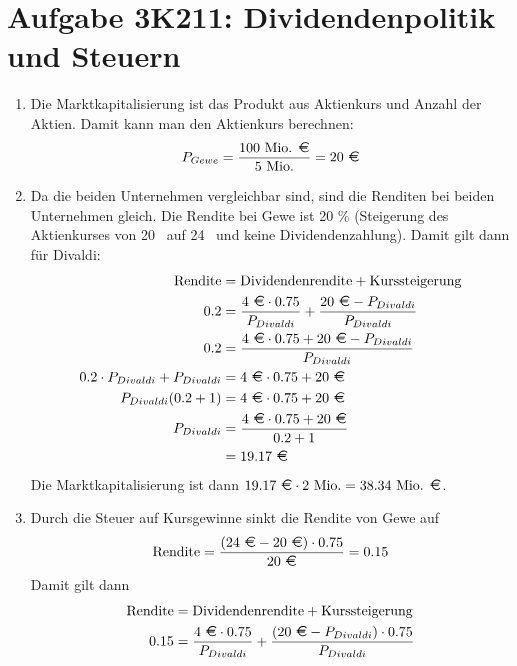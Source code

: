 \documentclass{article}
\begin{document}
	\section*{Aufgabe 3K211: Dividendenpolitik und Steuern}
	\begin{enumerate}[label=(\alph*)]
		\item Die Marktkapitalisierung ist das Produkt aus Aktienkurs und Anzahl der Aktien. Damit kann man den Aktienkurs berechnen:
		\begin{align}
			P_{Gewe} = \frac{100 \text{ Mio. \EUR}}{5 \text{ Mio.}} = 20 \text{ \EUR} \notag
		\end{align}
		\item Da die beiden Unternehmen vergleichbar sind, sind die Renditen bei beiden Unternehmen gleich. Die Rendite bei Gewe ist 20 \% (Steigerung des Aktienkurses von 20 \EUR\, auf 24 \EUR\, und keine Dividendenzahlung). Damit gilt dann für Divaldi:
		\begin{align}
			\text{Rendite} &= \text{Dividendenrendite} + \text{Kurssteigerung} \notag \\
			0.2 &= \frac{4\text{ \EUR}\cdot 0.75}{P_{Divaldi}} + \frac{20\text{ \EUR} - P_{Divaldi}}{P_{Divaldi}} \notag \\
			0.2 &= \frac{4\text{ \EUR}\cdot 0.75 + 20\text{ \EUR} - P_{Divaldi}}{P_{Divaldi}} \notag \\
			0.2\cdot P_{Divaldi} + P_{Divaldi} &= 4\text{ \EUR}\cdot 0.75 + 20 \text{ \EUR} \notag \\
			P_{Divaldi}(0.2 + 1) &= 4\text{ \EUR}\cdot 0.75 + 20 \text{ \EUR} \notag \\
			P_{Divaldi} &= \frac{4\text{ \EUR}\cdot 0.75 + 20 \text{ \EUR}}{0.2 + 1} \notag \\
			&= 19.17 \text{ \EUR} \notag
		\end{align}
		Die Marktkapitalisierung ist dann $19.17\text{ \EUR}\cdot 2\text{ Mio.} = 38.34\text{ Mio. \EUR}$.
		\item Durch die Steuer auf Kursgewinne sinkt die Rendite von Gewe auf
		\begin{align}
			\text{Rendite} = \frac{(24\text{ \EUR} - 20\text{ \EUR})\cdot 0.75}{20\text{ \EUR}}  = 0.15 \notag
		\end{align}
		Damit gilt dann
		\begin{align}
			\text{Rendite} &= \text{Dividendenrendite} + \text{Kurssteigerung} \notag \\
			0.15 &= \frac{4\text{ \EUR}\cdot 0.75}{P_{Divaldi}} + \frac{(20\text{ \EUR} - P_{Divaldi})\cdot 0.75}{P_{Divaldi}} \notag \\

\end{align}
\end{enumerate}
\end{document}
